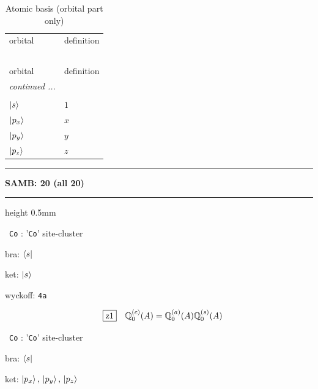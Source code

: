 \documentclass[fleqn,10pt,landscape]{jsarticle}
\begin{document}
\begin{longtable}[l]{ll}
\captionsetup{justification=raggedright, singlelinecheck=off}
\caption{Atomic basis (orbital part only)}
 \\
 \hline \hline
orbital & definition \\ \hline \endfirsthead

\multicolumn{1}{l}{\tablename\ \thetable{}} \\
 \hline \hline
orbital & definition \\ \hline \endhead

 \hline \hline
\multicolumn{1}{r}{\footnotesize\it continued ...} \\ \endfoot

 \hline \hline
\multicolumn{1}{r}{} \\ \endlastfoot

$ \ket{s} $ & $ 1 $ \\ \hline
$ \ket{p_{x}} $ & $ x $ \\
$ \ket{p_{y}} $ & $ y $ \\
$ \ket{p_{z}} $ & $ z $ \\
\end{longtable}
\vspace{5mm}
\noindent \rule[0.5mm]{5mm}{0.5mm}\hspace{3mm}\textbf{SAMB: 20 (all 20)}\hspace{3mm}\leaders\hrule height 0.5mm\hfill\kern0pt
\vspace{3mm}

\vspace{5mm}

\noindent\textbullet\, \texttt{Co} : '\texttt{Co}' site-cluster

\noindent\quad * bra: $\bra{s}$

\noindent\quad * ket: $\ket{s}$

\noindent\quad * wyckoff: \texttt{4a}

\begin{dmath*}
\hspace*{3mm}\fbox{z1}\quad \mathbb{Q}_{0}^{(c)}(A)=\mathbb{Q}_{0}^{(a)}(A) \mathbb{Q}_{0}^{(s)}(A)
\end{dmath*}
\vspace{5mm}

\noindent\textbullet\, \texttt{Co} : '\texttt{Co}' site-cluster

\noindent\quad * bra: $\bra{s}$

\noindent\quad * ket: $\ket{p_{x}},\, \ket{p_{y}},\, \ket{p_{z}}$
\end{document}
